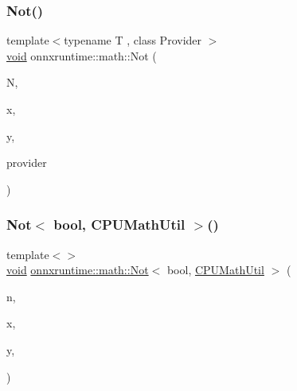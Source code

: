 \mbox{\label{namespaceonnxruntime_1_1math_a855745167c5f67a4917f5adf2f252c5d}} 
\subsubsection{\texorpdfstring{Not()}{Not()}}
{\footnotesize\ttfamily template$<$typename T , class Provider $>$ \\
\mbox{\hyperlink{mlasi_8h_a88f941d423cb2a819b70a1358982b1a6}{void}} onnxruntime\+::math\+::\+Not (\begin{DoxyParamCaption}\item[{const int}]{N,  }\item[{const T $\ast$}]{x,  }\item[{T $\ast$}]{y,  }\item[{Provider $\ast$}]{provider }\end{DoxyParamCaption})}

\mbox{\label{namespaceonnxruntime_1_1math_acedd20955c9a52f9e7e60517ef35fc79}} 
\subsubsection{\texorpdfstring{Not$<$ bool, C\+P\+U\+Math\+Util $>$()}{Not< bool, CPUMathUtil >()}}
{\footnotesize\ttfamily template$<$$>$ \\
\mbox{\hyperlink{mlasi_8h_a88f941d423cb2a819b70a1358982b1a6}{void}} \mbox{\hyperlink{namespaceonnxruntime_1_1math_a855745167c5f67a4917f5adf2f252c5d}{onnxruntime\+::math\+::\+Not}}$<$ bool, \mbox{\hyperlink{classonnxruntime_1_1CPUMathUtil}{C\+P\+U\+Math\+Util}} $>$ (\begin{DoxyParamCaption}\item[{const int}]{n,  }\item[{const bool $\ast$}]{x,  }\item[{bool $\ast$}]{y,  }\item[{\mbox{\hyperlink{classonnxruntime_1_1CPUMathUtil}{C\+P\+U\+Math\+Util}} $\ast$}]{ }\end{DoxyParamCaption})}

